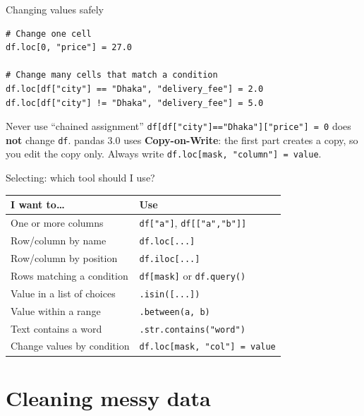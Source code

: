 \documentclass[aspectratio=169,10pt]{beamer}
\newcommand{\code}[1]{\texttt{#1}}
\begin{document}
\begin{frame}[fragile]{Changing values safely}
\begin{lstlisting}
# Change one cell
df.loc[0, "price"] = 27.0

# Change many cells that match a condition
df.loc[df["city"] == "Dhaka", "delivery_fee"] = 2.0
df.loc[df["city"] != "Dhaka", "delivery_fee"] = 5.0
\end{lstlisting}
  \begin{alertblock}{Never use ``chained assignment''}
    \code{df[df["city"]=="Dhaka"]["price"] = 0} does \textbf{not} change \code{df}.
    pandas 3.0 uses \textbf{Copy-on-Write}: the first part creates a copy, so you edit
    the copy only. Always write \code{df.loc[mask, "column"] = value}.
  \end{alertblock}
\end{frame}

\begin{frame}{Selecting: which tool should I use?}
  \renewcommand{\arraystretch}{1.25}
  \begin{center}
  \small
  \begin{tabular}{p{5.3cm}p{5.8cm}}
    \toprule
    \textbf{I want to\dots} & \textbf{Use}\\
    \midrule
    One or more columns & \code{df["a"]}, \code{df[["a","b"]]}\\
    Row/column by name & \code{df.loc[...]}\\
    Row/column by position & \code{df.iloc[...]}\\
    Rows matching a condition & \code{df[mask]} or \code{df.query()}\\
    Value in a list of choices & \code{.isin([...])}\\
    Value within a range & \code{.between(a, b)}\\
    Text contains a word & \code{.str.contains("word")}\\
    Change values by condition & \code{df.loc[mask, "col"] = value}\\
    \bottomrule
  \end{tabular}
  \end{center}
\end{frame}

\section{Cleaning messy data}
\end{document}
